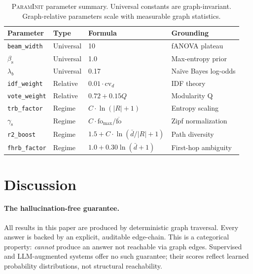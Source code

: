 \documentclass[10pt,twocolumn]{article}
\newcommand{\gS}{\gamma_{\mathrm{s}}}   %
\newcommand{\bS}{\beta_{\mathrm{s}}}    %
\newcommand{\PI}{\textsc{ParamInit}}
\begin{document}
\begin{table}[h]
\centering
\caption{\PI{} parameter summary. Universal constants are graph-invariant.
Graph-relative parameters scale with measurable graph statistics.}
\label{tab:paraminit}
\setlength{\tabcolsep}{4pt}
\begin{tabular}{llll}
\toprule
\textbf{Parameter} & \textbf{Type} & \textbf{Formula} & \textbf{Grounding} \\
\midrule
\texttt{beam\_width}  & Universal & 10            & fANOVA plateau \\
$\bS$                 & Universal & 1.0           & Max-entropy prior \\
$\lambda_b$           & Universal & 0.17          & Naïve Bayes log-odds \\
\texttt{idf\_weight}  & Relative  & $0.01\cdot\mathrm{cv}_d$ & IDF theory \\
\texttt{vote\_weight} & Relative  & $0.72+0.15Q$  & Modularity Q \\
\texttt{trb\_factor}  & Regime    & $C\cdot\ln(|R|{+}1)$ & Entropy scaling \\
$\gS$                 & Regime    & $C\cdot\mathrm{fo}_{\max}/\overline{\mathrm{fo}}$ & Zipf normalization \\
\texttt{r2\_boost}    & Regime    & $1.5+C\cdot\ln(\bar{d}/|R|{+}1)$ & Path diversity \\
\texttt{fhrb\_factor} & Regime    & $1.0+0.30\ln(\bar{d}{+}1)$ & First-hop ambiguity \\
\bottomrule
\end{tabular}
\end{table}

\section{Discussion}
\label{sec:discussion}

\paragraph{The hallucination-free guarantee.}
All results in this paper are produced by deterministic graph traversal. Every answer
is backed by an explicit, auditable edge-chain. This is a categorical property:
\CEREBRUM{} \emph{cannot} produce an answer not reachable via graph edges.
Supervised and LLM-augmented systems offer no such guarantee; their scores reflect
learned probability distributions, not structural reachability.
\end{document}
